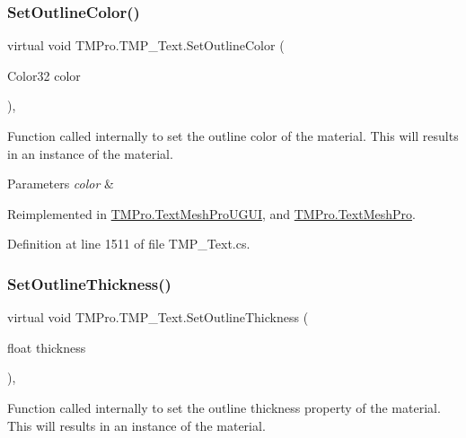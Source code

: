 \subsubsection{\texorpdfstring{SetOutlineColor()}{SetOutlineColor()}}
{\footnotesize\ttfamily virtual void T\+M\+Pro.\+T\+M\+P\+\_\+\+Text.\+Set\+Outline\+Color (\begin{DoxyParamCaption}\item[{Color32}]{color }\end{DoxyParamCaption})\hspace{0.3cm}{\ttfamily [protected]}, {\ttfamily [virtual]}}



Function called internally to set the outline color of the material. This will results in an instance of the material. 


\begin{DoxyParams}{Parameters}
{\em color} & \\
\hline
\end{DoxyParams}


Reimplemented in \mbox{\hyperlink{class_t_m_pro_1_1_text_mesh_pro_u_g_u_i_ab6bfded8873a3c3aea4639932ec6f4b7}{T\+M\+Pro.\+Text\+Mesh\+Pro\+U\+G\+UI}}, and \mbox{\hyperlink{class_t_m_pro_1_1_text_mesh_pro_a8a2741c314f991c67d538a7a607d74be}{T\+M\+Pro.\+Text\+Mesh\+Pro}}.



Definition at line 1511 of file T\+M\+P\+\_\+\+Text.\+cs.

\mbox{\label{class_t_m_pro_1_1_t_m_p___text_a64858ad286418942ec69bc438eec39d4}} 
\subsubsection{\texorpdfstring{SetOutlineThickness()}{SetOutlineThickness()}}
{\footnotesize\ttfamily virtual void T\+M\+Pro.\+T\+M\+P\+\_\+\+Text.\+Set\+Outline\+Thickness (\begin{DoxyParamCaption}\item[{float}]{thickness }\end{DoxyParamCaption})\hspace{0.3cm}{\ttfamily [protected]}, {\ttfamily [virtual]}}



Function called internally to set the outline thickness property of the material. This will results in an instance of the material. 


